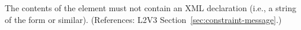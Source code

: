 The contents of the  element must not contain an XML
declaration (i.e., a string of the form  or similar).  (References: L2V3
Section~\ref{sec:constraint-message}.)
